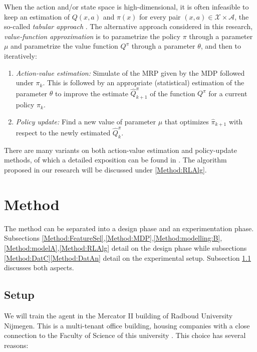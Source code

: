 \documentclass{article}
\theoremstyle{definition}
\theoremstyle{remark}
\newcommand{\stat}{\mathcal{X}}
\newcommand{\act}{\mathcal{A}}
\begin{document}
When the action and/or state space is high-dimensional, it is often infeasible to keep an estimation of $Q(x,a)$ and $\pi(x)$ for every pair $(x,a) \in \stat\times\act$, the so-called \textit{tabular approach} \cite{suttonbarto2018, Szepesvari2010}. The alternative approach considered in this research, \textit{value-function approximation} is to parametrize the policy $\pi$ through a parameter $\mu$ and parametrize the value function $Q^\pi$ through a parameter $\theta$, and then to iteratively:
\begin{enumerate}
    \item \textit{Action-value estimation:} Simulate of the MRP given by the MDP followed under $\pi_k$. This is followed by an appropriate (statistical) estimation of the parameter $\theta$ to improve the estimate $\hat Q^\pi_{k+1}$ of the function $Q^\pi$ for a current policy $\pi_k$.
    
    \item \textit{Policy update:} Find a new value of parameter $\mu$ that optimizes $\hat\pi_{k+1}$ with respect to the newly estimated $\hat Q^\pi_k$.
\end{enumerate}

There are many variants on both action-value estimation and policy-update methods, of which a detailed exposition can be found in \cite{suttonbarto2018, Szepesvari2010}. The algorithm proposed in our research will be discussed under \ref{Method:RLAlg}.


\section{Method}
The method can be separated into a design phase and an experimentation phase. Subsections \ref{Method:FeatureSel},\ref{Method:MDP},\ref{Method:modelling:B},\ref{Method:modelA},\ref{Method:RLAlg} detail on the design phase while subsections \ref{Method:DatC}\ref{Method:DatAn} detail on the experimental setup. Subsection \ref{Method:setup} discusses both aspects.
\subsection{Setup}\label{Method:setup}
We will train the agent in the Mercator II building of Radboud University Nijmegen. This is a multi-tenant office building, housing companies with a close connection to the Faculty of Science of this university \cite{MercatorSciencePark_2023}. This choice has several reasons:
\end{document}
